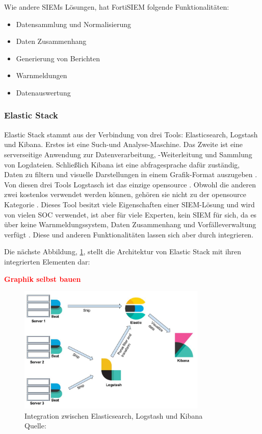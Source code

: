Wie andere \glspl{SIEM} Lösungen, hat FortiSIEM folgende Funktionalitäten:

\begin{itemize}[noitemsep]
   \item Datensammlung und Normalisierung
   \item Daten Zusammenhang
   \item Generierung von Berichten
   \item Warnmeldungen
   \item Datenauswertung
\end{itemize}

\subsubsection{Elastic Stack}
Elastic Stack stammt aus der Verbindung von drei Tools: Elasticsearch, Logstash und Kibana. Erstes ist eine Such-und Analyse-Maschine. Das Zweite ist eine serverseitige Anwendung zur Datenverarbeitung, -Weiterleitung und Sammlung von Logdateien. Schließlich Kibana \label{kibana} ist eine \gls{abfragesprache} dafür zuständig, Daten zu filtern und visuelle Darstellungen in einem Grafik-Format auszugeben \citep{packt_elkstack}. Von diesen drei Tools Logstasch ist das einzige \gls{opensource} \citep{elastic_OSI}. Obwohl die anderen zwei 
kostenlos verwendet werden können, gehören sie nicht zu der \gls{opensource} Kategorie \citep{OpenSource_Def}. Dieses Tool besitzt viele Eigenschaften einer \gls{SIEM}-Lösung und wird von vielen SOC verwendet, ist aber für viele Experten, kein \gls{SIEM} für sich, da es über keine Warnmeldungssystem, Daten Zusammenhang und Vorfälleverwaltung verfügt \citep{Miller_ELK}. Diese und anderen Funktionalitäten lassen sich aber durch  integrieren. 

\newpage
Die nächste Abbildung, \ref{fig:Intregation_ELK}, stellt die Architektur von Elastic Stack mit ihren integrierten Elementen dar:

\textbf{\textcolor{red}{Graphik selbst bauen}}

\begin{figure}[H]
   \centering
   \includegraphics[width=0.8\textwidth]{assets/2_p8.png}
   \caption[Integration zwischen Elasticsearch, Logstash und Kibana]
   {Integration zwischen Elasticsearch, Logstash und Kibana\\Quelle: \citep{packt_elkstack} }
   \label{fig:Intregation_ELK}
   \centering
\end{figure}

